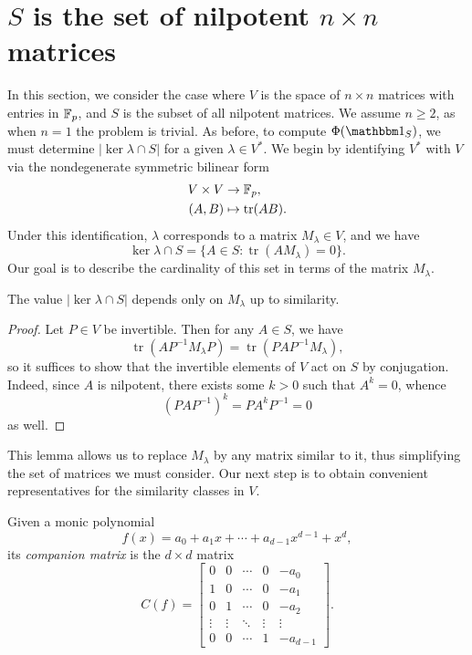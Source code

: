 \newcommand{\Mat}{\operatorname{Mat}}
\newcommand{\tr}{\operatorname{tr}}
\newcommand{\fact}{\operatorname{fact}}

\section{$S$ is the set of nilpotent $n\times n$ matrices}\label{sec:part3}

In this section, we consider the case where $V$ is the space of $n\times n$ matrices with entries in $\mathbb{F}_p$, and $S$ is the subset of all nilpotent matrices. We assume $n\ge 2$, as when $n=1$ the problem is trivial. As before, to compute $\Phi(\IND_S)$, we must determine $|\ker\lambda\cap S|$ for a given $\lambda\in V^*$. We begin by identifying $V^*$ with $V$ via the nondegenerate symmetric bilinear form
\begin{align*}
V\times V&\to\F_p,\\
(A,B)&\mapsto\tr(AB).
\end{align*}
Under this identification, $\lambda$ corresponds to a matrix $M_\lambda\in V$, and we have
\begin{equation}
\label{eqn:kerlambda}
\ker\lambda\cap S=\{A\in S:\tr(AM_\lambda)=0\}.
\end{equation}
Our goal is to describe the cardinality of this set in terms of the matrix $M_\lambda$.
\begin{lem}
\label{lem:sim}
The value $|\ker\lambda\cap S|$ depends only on $M_\lambda$ up to similarity.
\end{lem}
\begin{proof}
Let $P\in V$ be invertible. Then for any $A\in S$, we have
\begin{equation*}
\tr(AP^{-1}M_\lambda P)=\tr(PAP^{-1}M_\lambda),
\end{equation*}
so it suffices to show that the invertible elements of $V$ act on $S$ by conjugation. Indeed, since $A$ is nilpotent, there exists some $k>0$ such that $A^k=0$, whence
\begin{equation*}
(PAP^{-1})^k=PA^kP^{-1}=0
\end{equation*}
as well.
\end{proof}
This lemma allows us to replace $M_\lambda$ by any matrix similar to it, thus simplifying the set of matrices we must consider. Our next step is to obtain convenient representatives for the similarity classes in $V$.
\begin{notation}
Given a monic polynomial
\begin{equation*}
f(x)=a_0+a_1x+\cdots+a_{d-1}x^{d-1}+x^d,
\end{equation*}
its \emph{companion matrix} is the $d\times d$ matrix
\begin{equation*}
C(f)=\begin{bmatrix}
0&0&\cdots&0&-a_0\\
1&0&\cdots&0&-a_1\\
0&1&\cdots&0&-a_2\\
\vdots&\vdots&\ddots&\vdots&\vdots\\
0&0&\cdots&1&-a_{d-1}
\end{bmatrix}.
\end{equation*}
\end{notation}
